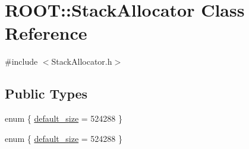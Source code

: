 \hypertarget{classROOT_1_1Minuit2_1_1StackAllocator}{}\section{R\+O\+OT\+:\+:Stack\+Allocator Class Reference}
\label{classROOT_1_1Minuit2_1_1StackAllocator}


{\ttfamily \#include $<$Stack\+Allocator.\+h$>$}

\subsection*{Public Types}
\begin{DoxyCompactItemize}
\item 
enum \{ \mbox{\hyperlink{classROOT_1_1Minuit2_1_1StackAllocator_a0dae1f615a86b14f157e1b4d021b9414a308d739070cf62de267a1793a45142e8}{default\+\_\+size}} = 524288
 \}
\item 
enum \{ \mbox{\hyperlink{classROOT_1_1Minuit2_1_1StackAllocator_a0dae1f615a86b14f157e1b4d021b9414a308d739070cf62de267a1793a45142e8}{default\+\_\+size}} = 524288
 \}
\end{DoxyCompactItemize}
